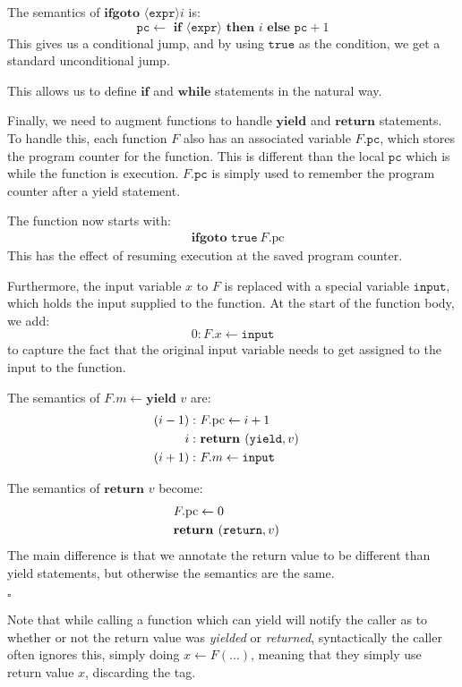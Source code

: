 \begin{definition}
The semantics of $\textbf{ifgoto } \langle \texttt{expr} \rangle i$ is:
$$
\texttt{pc} \gets \textbf{ if } \langle \texttt{expr} \rangle \textbf{ then } i \textbf{ else } \texttt{pc} + 1
$$
This gives us a conditional jump, and by using $\texttt{true}$ as the condition,
we get a standard unconditional jump.

This allows us to define $\textbf{if}$ and $\textbf{while}$ statements
in the natural way.

Finally, we need to augment functions to handle $\textbf{yield}$ and $\textbf{return}$
statements.
To handle this, each function $F$ also has an associated variable
$F.\texttt{pc}$, which stores the program counter for the function.
This is different than the local $\texttt{pc}$ which is while the function is
execution.
$F.\texttt{pc}$ is simply used to remember the program counter after a yield
statement.

The function now starts with:
$$
\begin{aligned}
&\textbf{ifgoto } \texttt{true}\ F.\text{pc} 
\end{aligned}
$$
This has the effect of resuming execution at the saved program counter.

Furthermore, the input variable $x$ to $F$ is replaced with a special
variable $\texttt{input}$, which holds the input supplied to the function.
At the start of the function body, we add:
$$
0: F.x \gets \texttt{input}
$$
to capture the fact that the original input variable needs to get assigned
to the input to the function.

The semantics of $F.m \gets \textbf{yield } v$ are:
$$
\begin{aligned}
(i-1):&\ F.\text{pc} \gets i + 1\cr
i:&\ \textbf{return } (\texttt{yield}, v)\cr
(i + 1):&\ F.m \gets \texttt{input}
\end{aligned}
$$

The semantics of $\textbf{return } v$ become:
$$
\begin{aligned}
&F.\text{pc} \gets 0\cr
&\textbf{return } (\texttt{return}, v)
\end{aligned}
$$
The main difference is that we annotate the return value to be different than
yield statements, but otherwise the semantics are the same.

$\square$
\end{definition}

Note that while calling a function which can yield will notify the
caller as to whether or not the return value was \emph{yielded}
or \emph{returned}, syntactically the caller often ignores this,
simply doing $x \gets F(\ldots)$, meaning that they simply use
return value $x$, discarding the tag.

